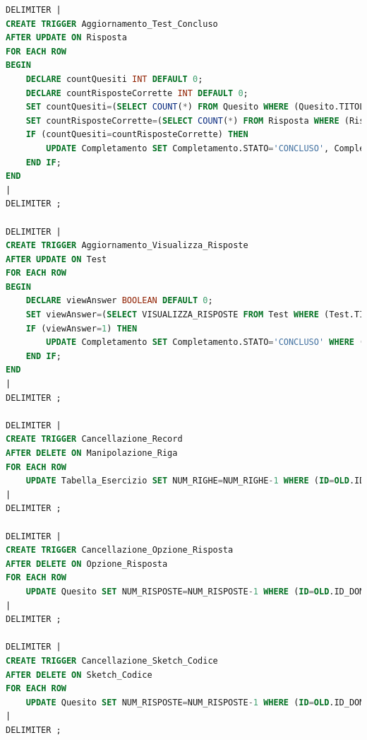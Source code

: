 \documentclass{article}
\begin{document}
\begin{lstlisting}[language=SQL, title=Codice SQL completo dei trigger dello schema della basi di dati.]
DELIMITER |
CREATE TRIGGER Aggiornamento_Test_Concluso
AFTER UPDATE ON Risposta
FOR EACH ROW
BEGIN
    DECLARE countQuesiti INT DEFAULT 0;
    DECLARE countRisposteCorrette INT DEFAULT 0;
    SET countQuesiti=(SELECT COUNT(*) FROM Quesito WHERE (Quesito.TITOLO_TEST=NEW.TITOLO_TEST));
    SET countRisposteCorrette=(SELECT COUNT(*) FROM Risposta WHERE (Risposta.TITOLO_TEST=NEW.TITOLO_TEST) AND (Risposta.EMAIL_STUDENTE=NEW.EMAIL_STUDENTE) AND (Risposta.ESITO=1));
    IF (countQuesiti=countRisposteCorrette) THEN 
        UPDATE Completamento SET Completamento.STATO='CONCLUSO', Completamento.DATA_ULTIMARISPOSTA=NOW() WHERE (Completamento.TITOLO_TEST=NEW.TITOLO_TEST) AND (Completamento.EMAIL_STUDENTE=NEW.EMAIL_STUDENTE);
    END IF; 
END
|
DELIMITER ;

DELIMITER |
CREATE TRIGGER Aggiornamento_Visualizza_Risposte
AFTER UPDATE ON Test
FOR EACH ROW
BEGIN
    DECLARE viewAnswer BOOLEAN DEFAULT 0;
    SET viewAnswer=(SELECT VISUALIZZA_RISPOSTE FROM Test WHERE (Test.TITOLO=NEW.TITOLO));
    IF (viewAnswer=1) THEN 
        UPDATE Completamento SET Completamento.STATO='CONCLUSO' WHERE (Completamento.TITOLO_TEST=NEW.TITOLO);
    END IF; 
END
|
DELIMITER ;

DELIMITER |
CREATE TRIGGER Cancellazione_Record
AFTER DELETE ON Manipolazione_Riga
FOR EACH ROW
    UPDATE Tabella_Esercizio SET NUM_RIGHE=NUM_RIGHE-1 WHERE (ID=OLD.ID_TABELLA);
|
DELIMITER ;

DELIMITER |
CREATE TRIGGER Cancellazione_Opzione_Risposta
AFTER DELETE ON Opzione_Risposta
FOR EACH ROW
    UPDATE Quesito SET NUM_RISPOSTE=NUM_RISPOSTE-1 WHERE (ID=OLD.ID_DOMANDA_CHIUSA);
|
DELIMITER ;

DELIMITER |
CREATE TRIGGER Cancellazione_Sketch_Codice
AFTER DELETE ON Sketch_Codice
FOR EACH ROW
    UPDATE Quesito SET NUM_RISPOSTE=NUM_RISPOSTE-1 WHERE (ID=OLD.ID_DOMANDA_CODICE);
|
DELIMITER ; 
\end{lstlisting}
\end{document}
